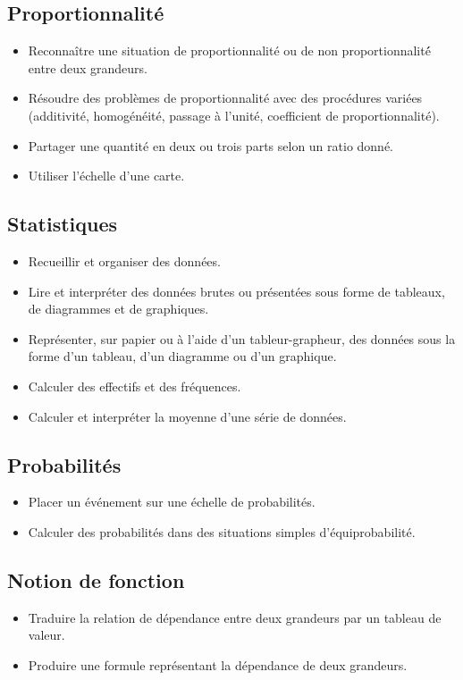 \documentclass[a4paper,12pt,fleqn]{article}	
\begin{document}
\renewcommand{\labelitemi}{}

\subsection*{Proportionnalité}

\begin{itemize}
	\item {}Reconnaître une situation de proportionnalité ou de non proportionnalité́ entre deux grandeurs.
	\item {}Résoudre des problèmes de proportionnalité avec des procédures variées (additivité, homogénéité, passage à l’unité, coefficient de proportionnalité).
	\item {}Partager une quantité en deux ou trois parts selon un ratio donné.
	\item {}Utiliser l’échelle d’une carte.
\end{itemize}

\subsection*{Statistiques}

\begin{itemize}
	\item {}Recueillir et organiser des données.
	\item {}Lire et interpréter des données brutes ou présentées sous forme de tableaux, de diagrammes et de graphiques.
	\item {}Représenter, sur papier ou à l’aide d’un tableur-grapheur, des données sous la forme d’un tableau, d’un diagramme ou d’un graphique.
	\item {}Calculer des effectifs et des fréquences.
	\item {}Calculer et interpréter la moyenne d’une série de données.
\end{itemize}

\subsection*{Probabilités}

\begin{itemize}
	\item {}Placer un événement sur une échelle de probabilités.
	\item {}Calculer des probabilités dans des situations simples d’équiprobabilité.
\end{itemize}

\subsection*{Notion de fonction}

\begin{itemize}
	\item {}Traduire la relation de dépendance entre deux grandeurs par un tableau de valeur.
	\item {}Produire une formule représentant la dépendance de deux grandeurs.
\end{itemize}

	
\end{document}
